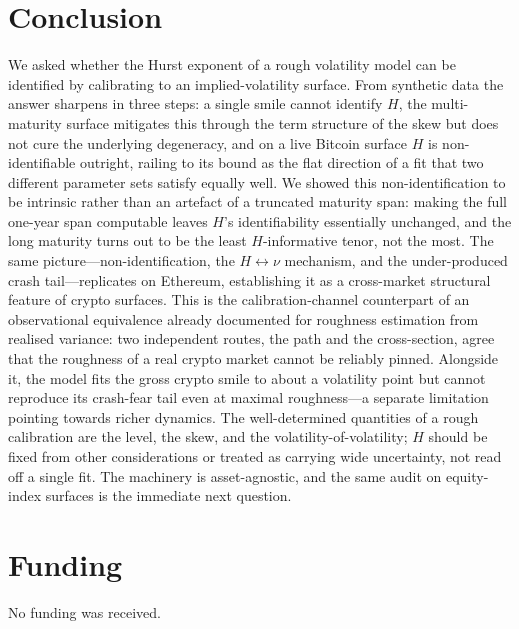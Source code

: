 \documentclass[11pt,a4paper]{article}
\numberwithin{equation}{section}
\begin{document}
\section{Conclusion}\label{sec:conclusion}

We asked whether the Hurst exponent of a rough volatility model can be identified by calibrating to an
implied-volatility surface. From synthetic data the answer sharpens in three steps: a single smile
cannot identify $H$, the multi-maturity surface mitigates this through the term structure of the skew
but does not cure the underlying degeneracy, and on a live Bitcoin surface $H$ is non-identifiable
outright, railing to its bound as the flat direction of a fit that two different parameter sets satisfy
equally well. We showed this non-identification to be intrinsic rather than an artefact of a truncated
maturity span: making the full one-year span computable leaves $H$'s identifiability essentially
unchanged, and the long maturity turns out to be the least $H$-informative tenor, not the most. The
same picture---non-identification, the $H\leftrightarrow\nu$ mechanism, and the under-produced crash
tail---replicates on Ethereum, establishing it as a cross-market structural feature of crypto surfaces.
This is the calibration-channel counterpart of an observational equivalence already documented for
roughness estimation from realised variance: two independent routes, the path and the cross-section,
agree that the roughness of a real crypto market cannot be reliably pinned. Alongside it, the model
fits the gross crypto smile to about a volatility point but cannot reproduce its crash-fear tail even
at maximal roughness---a separate limitation pointing towards richer dynamics. The well-determined
quantities of a rough calibration are the level, the skew, and the volatility-of-volatility; $H$
should be fixed from other considerations or treated as carrying wide uncertainty, not read off a
single fit. The machinery is asset-agnostic, and the same audit on equity-index surfaces is the
immediate next question.

\section*{Funding}
No funding was received.
\end{document}
